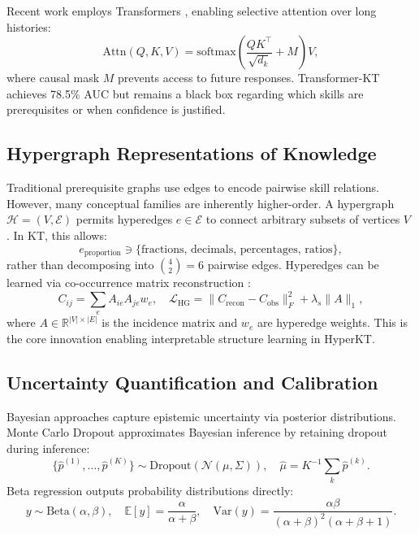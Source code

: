 \documentclass[preprint,12pt]{elsarticle}
\begin{document}
Recent work employs Transformers \cite{Liu2023Self,Choi2020Towards}, enabling selective attention over long histories:
\begin{equation}
\text{Attn}(Q, K, V) = \text{softmax}\left(\frac{QK^\top}{\sqrt{d_k}} + M\right)V,
\end{equation}
where causal mask $M$ prevents access to future responses. Transformer-KT achieves 78.5\% AUC but remains a black box regarding which skills are prerequisites or when confidence is justified.

\subsection{Hypergraph Representations of Knowledge}

Traditional prerequisite graphs use edges to encode pairwise skill relations. However, many conceptual families are inherently higher-order. A hypergraph $\mathcal{H} = (V, \mathcal{E})$ permits hyperedges $e \in \mathcal{E}$ to connect arbitrary subsets of vertices $V$ \cite{feng2019hypergraph}. In KT, this allows:
\begin{equation}
e_{\text{proportion}} \ni \{\text{fractions, decimals, percentages, ratios}\},
\end{equation}
rather than decomposing into $\binom{4}{2} = 6$ pairwise edges. Hyperedges can be learned via co-occurrence matrix reconstruction \cite{wang2020hypergraph}:
\begin{equation}
C_{ij} = \sum_{e} A_{ie} A_{je} w_e, \quad \mathcal{L}_{\text{HG}} = \|C_{\text{recon}} - C_{\text{obs}}\|_F^2 + \lambda_s \|A\|_1,
\end{equation}
where $A \in \mathbb{R}^{|V| \times |E|}$ is the incidence matrix and $w_e$ are hyperedge weights. This is the core innovation enabling interpretable structure learning in HyperKT.

\subsection{Uncertainty Quantification and Calibration}

Bayesian approaches capture epistemic uncertainty via posterior distributions. Monte Carlo Dropout \cite{gal2016dropout} approximates Bayesian inference by retaining dropout during inference:
\begin{equation}
\{\hat{p}^{(1)}, \ldots, \hat{p}^{(K)}\} \sim \text{Dropout}(\mathcal{N}(\mu, \Sigma)), \quad \hat{\mu} = K^{-1}\sum_k \hat{p}^{(k)}.
\end{equation}
Beta regression \cite{ferrari2004beta} outputs probability distributions directly:
\begin{equation}
y \sim \text{Beta}(\alpha, \beta), \quad \mathbb{E}[y] = \frac{\alpha}{\alpha + \beta}, \quad \text{Var}(y) = \frac{\alpha\beta}{(\alpha+\beta)^2(\alpha+\beta+1)}.
\end{equation}
\end{document}
